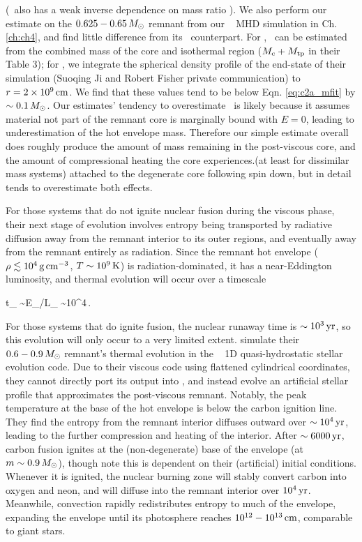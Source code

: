 \noindent (\Mcpv\ also has a weak inverse dependence on mass ratio \qm).  We also perform our estimate on the $0.625 - 0.65\,\Msun$ remnant from our \arepo\ \citep{spri10} MHD simulation in Ch. \ref{ch:ch4}, and find little difference from its \gasoline\ counterpart.  For \cite{schw+12}, \Mcpv\ can be estimated from the combined mass of the core and isothermal region ($M_\mathrm{c} + M_\mathrm{tp}$ in their Table 3); for \cite{ji+13}, we integrate the spherical density profile of the end-state of their simulation (Suoqing Ji and Robert Fisher private communication) to $r = 2\times10^9\,\mathrm{cm}$.  We find that these values tend to be below Eqn. \ref{eq:c2a_mfit} by $\sim0.1\,\Msun$.  Our estimates' tendency to overestimate \Mcpv\ is likely because it assumes material not part of the remnant core is marginally bound with $E = 0$, leading to underestimation of the hot envelope mass.  Therefore our simple estimate overall does roughly produce the amount of mass remaining in the post-viscous core, and the amount of compressional heating the core experiences.(at least for dissimilar mass systems) attached to the degenerate core following spin down, but in detail tends to overestimate both effects.

For those systems that do not ignite nuclear fusion during the viscous phase, their next stage of evolution involves entropy being transported by radiative diffusion away from the remnant interior to its outer regions, and eventually away from the remnant entirely as radiation.  Since the remnant hot envelope ($\rho \lesssim 10^4\,\gcc$, $T \sim 10^9\,\mathrm{K}$) is radiation-dominated, it has a near-Eddington luminosity, and thermal evolution will occur over a timescale \citep{shen+12}

\eqbegin
t_ \sim E_/L_ \sim 10^4\,.
\eqend

\noindent For those systems that do ignite fusion, the nuclear runaway time is $\sim10^3\,\mathrm{yr}$, so this evolution will only occur to a very limited extent.  \cite{shen+12} simulate their $0.6-0.9\,\Msun$ remnant's thermal evolution in the \mesa\ \citep{paxt+11} 1D quasi-hydrostatic stellar evolution code.  Due to their viscous code using flattened cylindrical coordinates, they cannot directly port its output into \mesa, and instead evolve an artificial stellar profile that approximates the post-viscous remnant.  Notably, the peak temperature at the base of the hot envelope is below the carbon ignition line.  They find the entropy from the remnant interior diffuses outward over $\sim10^4\,\mathrm{yr}$, leading to the further compression and heating of the interior.  After $\sim6000\,\mathrm{yr}$, carbon fusion ignites at the (non-degenerate) base of the envelope (at $m \sim 0.9\,\Msun$), though \cite{shen+12} note this is dependent on their (artificial) initial conditions.  Whenever it is ignited, the nuclear burning zone will stably convert carbon into oxygen and neon, and will diffuse into the remnant interior over $10^4\,\mathrm{yr}$.  Meanwhile, convection rapidly redistributes entropy to much of the envelope, expanding the envelope until its photosphere reaches $10^{12}-10^{13}\,\mathrm{cm}$, comparable to giant stars.  

